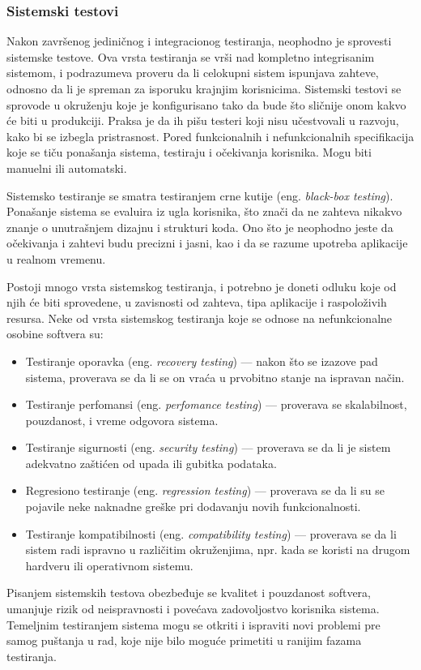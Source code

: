 \documentclass[12pt,oneside]{memoir}
\begin{document}
\subsubsection{Sistemski testovi}
\label{sec:system}
\par Nakon završenog jediničnog i integracionog testiranja, neophodno je sprovesti sistemske testove. Ova vrsta testiranja se vrši nad kompletno integrisanim sistemom, i podrazumeva proveru da li celokupni sistem ispunjava zahteve, odnosno da li je spreman za isporuku krajnjim korisnicima. Sistemski testovi se sprovode u okruženju koje je konfigurisano tako da bude što sličnije onom kakvo će biti u produkciji. Praksa je da ih pišu testeri koji nisu učestvovali u razvoju, kako bi se izbegla pristrasnost. Pored funkcionalnih i nefunkcionalnih specifikacija koje se tiču ponašanja sistema, testiraju i očekivanja korisnika. Mogu biti manuelni ili automatski. 
\par Sistemsko testiranje se smatra testiranjem crne kutije (eng. \emph{black-box testing}). Ponašanje sistema se evaluira iz ugla korisnika, što znači da ne zahteva nikakvo znanje o unutrašnjem dizajnu i strukturi koda. Ono što je neophodno jeste da očekivanja i zahtevi budu precizni i jasni, kao i da se razume upotreba aplikacije u realnom vremenu. 
\par Postoji mnogo vrsta sistemskog testiranja, i potrebno je doneti odluku koje od njih će biti sprovedene, u zavisnosti od zahteva, tipa aplikacije i raspoloživih resursa.  Neke od vrsta sistemskog testiranja koje se odnose na nefunkcionalne osobine softvera su: 
\begin{itemize}
\item Testiranje oporavka (eng. \emph{recovery testing}) --- nakon što se izazove pad sistema, proverava se da li se on vraća u prvobitno stanje na ispravan način.
\item Testiranje perfomansi (eng. \emph{perfomance testing}) --- proverava se skalabilnost, pouzdanost, i vreme odgovora sistema.
\item Testiranje sigurnosti (eng. \emph{security testing}) --- proverava se da li je sistem adekvatno zaštićen od upada ili gubitka podataka. 
\item Regresiono testiranje (eng. \emph{regression testing}) --- proverava se da li su se pojavile neke naknadne greške pri dodavanju novih funkcionalnosti. 
\item Testiranje kompatibilnosti (eng. \emph{compatibility testing}) --- proverava se da li sistem radi ispravno u različitim okruženjima, npr. kada se koristi na drugom hardveru ili operativnom sistemu.
\end{itemize}
\par Pisanjem sistemskih testova obezbeđuje se kvalitet i pouzdanost softvera, umanjuje rizik od neispravnosti i povećava zadovoljostvo korisnika sistema. Temeljnim testiranjem sistema mogu se otkriti i ispraviti novi problemi pre samog puštanja u rad, koje nije bilo moguće primetiti u ranijim fazama testiranja. 
\end{document}
